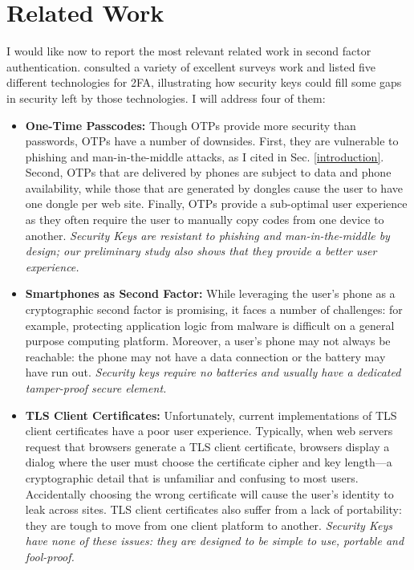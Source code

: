\section{Related Work}\label{related-work}
I would like now to report the most relevant related work in second factor authentication. \citet{lang2016security} consulted a variety of excellent surveys work \cite{bonneau2012quest,herley2009passwords,biddle2012graphical,jain2007handbook} and listed five different technologies for 2FA, illustrating how security keys could fill some gaps in security left by those technologies. I will address four of them:
\begin{itemize}
    \item \textbf{One-Time Passcodes:} Though OTPs provide more security than passwords, OTPs have a number of downsides. First, they are vulnerable to phishing and man-in-the-middle attacks, as I cited in Sec. \ref{introduction}. Second, OTPs that are delivered by phones are subject to data and phone availability, while those that are generated by dongles cause the user to have one dongle per web site. Finally, OTPs provide a sub-optimal user experience as they often require the user to manually copy codes from one device to another. \emph{Security Keys are resistant to phishing and man-in-the-middle by design; our preliminary study also shows that they provide a better user experience.}
    \item \textbf{Smartphones as Second Factor:} While leveraging the user’s phone as a cryptographic second factor is promising, it faces a number of challenges: for example, protecting application logic from malware is difficult on a general purpose computing platform. Moreover, a user’s phone may not always be reachable: the phone may not have a data connection or the battery may have run out. \emph{Security keys require no batteries and usually have a dedicated
    tamper-proof secure element.}
    \item \textbf{TLS Client Certificates:} Unfortunately, current implementations of TLS client certificates have a poor user experience. Typically, when web servers request that browsers generate a TLS client certificate, browsers display a dialog where the user must choose the certificate cipher and key length—a cryptographic detail that is unfamiliar and confusing to most users. Accidentally choosing the wrong certificate will cause the user’s identity to leak across sites. TLS client certificates also suffer from a lack of portability: they are tough to move from one client platform to another. \emph{Security Keys have none of these issues: they are designed to be simple to use, portable and fool-proof.}

\end{itemize}
